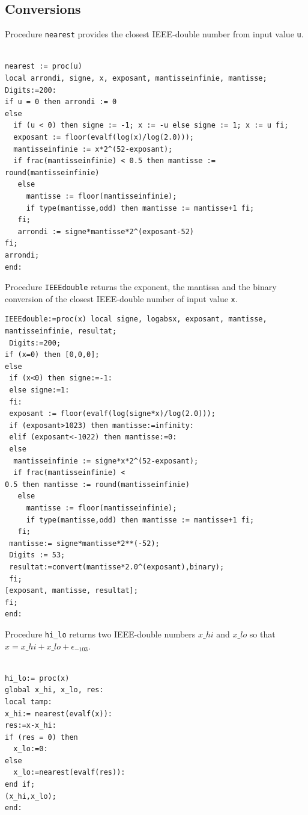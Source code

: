 \subsection{Conversions}

Procedure \texttt{nearest} provides the closest IEEE-double number
from input value \texttt{u}.

\begin{lstlisting}[caption={nearest},firstnumber=1]

nearest := proc(u)
local arrondi, signe, x, exposant, mantisseinfinie, mantisse;
Digits:=200:
if u = 0 then arrondi := 0
else 
  if (u < 0) then signe := -1; x := -u else signe := 1; x := u fi;
  exposant := floor(evalf(log(x)/log(2.0)));
  mantisseinfinie := x*2^(52-exposant);
  if frac(mantisseinfinie) < 0.5 then mantisse := round(mantisseinfinie)
   else
     mantisse := floor(mantisseinfinie);
     if type(mantisse,odd) then mantisse := mantisse+1 fi;
   fi;
   arrondi := signe*mantisse*2^(exposant-52)
fi;
arrondi;
end:
\end{lstlisting}



Procedure \texttt{IEEEdouble} returns the exponent, the mantissa and the
binary conversion of the closest IEEE-double number of input value \texttt{x}.

\begin{lstlisting}[caption={IEEEdouble},firstnumber=1]
IEEEdouble:=proc(x) local signe, logabsx, exposant, mantisse, mantisseinfinie, resultat; 
 Digits:=200;
if (x=0) then [0,0,0]; 
else 
 if (x<0) then signe:=-1:
 else signe:=1:
 fi:
 exposant := floor(evalf(log(signe*x)/log(2.0)));
 if (exposant>1023) then mantisse:=infinity:
 elif (exposant<-1022) then mantisse:=0:
 else 
  mantisseinfinie := signe*x*2^(52-exposant);
  if frac(mantisseinfinie) <
0.5 then mantisse := round(mantisseinfinie)
   else
     mantisse := floor(mantisseinfinie);
     if type(mantisse,odd) then mantisse := mantisse+1 fi;
   fi;
 mantisse:= signe*mantisse*2**(-52);
 Digits := 53;
 resultat:=convert(mantisse*2.0^(exposant),binary);
 fi;
[exposant, mantisse, resultat];
fi;
end:
\end{lstlisting}

Procedure \texttt{hi\_lo} returns two IEEE-double numbers $x\_hi$ and $x\_lo$ so that $x = x\_hi + x\_lo + \epsilon_{-103}$.

\begin{lstlisting}[caption={hi\_lo},firstnumber=1]

hi_lo:= proc(x)
global x_hi, x_lo, res:
local tamp:
x_hi:= nearest(evalf(x)):
res:=x-x_hi:
if (res = 0) then
  x_lo:=0:
else
  x_lo:=nearest(evalf(res)):
end if;
(x_hi,x_lo);
end:
\end{lstlisting}
\vspace{0.5cm}



